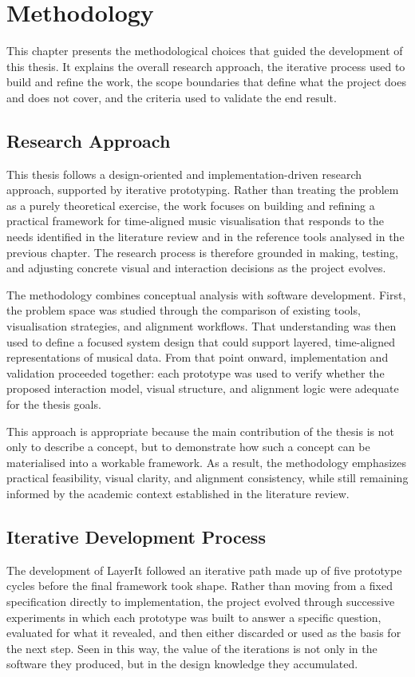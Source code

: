\chapter{Methodology} \label{chap:Methodology}
This chapter presents the methodological choices that guided the development of this thesis. It explains the overall research approach, the iterative process used to build and refine the work, the scope boundaries that define what the project does and does not cover, and the criteria used to validate the end result.

\section{Research Approach}
This thesis follows a design-oriented and implementation-driven research approach, supported by iterative prototyping. Rather than treating the problem as a purely theoretical exercise, the work focuses on building and refining a practical framework for time-aligned music visualisation that responds to the needs identified in the literature review and in the reference tools analysed in the previous chapter. The research process is therefore grounded in making, testing, and adjusting concrete visual and interaction decisions as the project evolves.

The methodology combines conceptual analysis with software development. First, the problem space was studied through the comparison of existing tools, visualisation strategies, and alignment workflows. That understanding was then used to define a focused system design that could support layered, time-aligned representations of musical data. From that point onward, implementation and validation proceeded together: each prototype was used to verify whether the proposed interaction model, visual structure, and alignment logic were adequate for the thesis goals.

This approach is appropriate because the main contribution of the thesis is not only to describe a concept, but to demonstrate how such a concept can be materialised into a workable framework. As a result, the methodology emphasizes practical feasibility, visual clarity, and alignment consistency, while still remaining informed by the academic context established in the literature review.

\section{Iterative Development Process}
The development of LayerIt followed an iterative path made up of five prototype cycles before the final framework took shape. Rather than moving from a fixed specification directly to implementation, the project evolved through successive experiments in which each prototype was built to answer a specific question, evaluated for what it revealed, and then either discarded or used as the basis for the next step. Seen in this way, the value of the iterations is not only in the software they produced, but in the design knowledge they accumulated.

